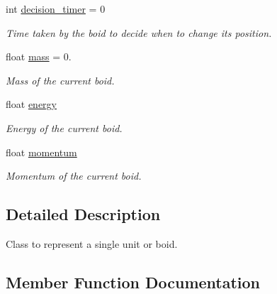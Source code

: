 \begin{DoxyCompactItemize}
\mbox{\label{class_boid_ad80d5244136eb1da1723506609ea29a4}} 
int \mbox{\hyperlink{class_boid_ad80d5244136eb1da1723506609ea29a4}{decision\+\_\+timer}} = 0
\begin{DoxyCompactList}\small\item\em Time taken by the boid to decide when to change its position. \end{DoxyCompactList}\item 
\mbox{\label{class_boid_a3d6ba3f51ea31d95c2d18bc70b884981}} 
float \mbox{\hyperlink{class_boid_a3d6ba3f51ea31d95c2d18bc70b884981}{mass}} = 0.
\begin{DoxyCompactList}\small\item\em Mass of the current boid. \end{DoxyCompactList}\item 
\mbox{\label{class_boid_a745696a6bd855bb7ac3464bdc05a2fd5}} 
float \mbox{\hyperlink{class_boid_a745696a6bd855bb7ac3464bdc05a2fd5}{energy}}
\begin{DoxyCompactList}\small\item\em Energy of the current boid. \end{DoxyCompactList}\item 
\mbox{\label{class_boid_a38ae17acf614f4f001584e908b6f3333}} 
float \mbox{\hyperlink{class_boid_a38ae17acf614f4f001584e908b6f3333}{momentum}}
\begin{DoxyCompactList}\small\item\em Momentum of the current boid. \end{DoxyCompactList}\end{DoxyCompactItemize}


\subsection{Detailed Description}
Class to represent a single unit or boid. 

\subsection{Member Function Documentation}
\mbox{\label{class_boid_a4e57f0bfa16c25001a7b0909185781e4}} 
